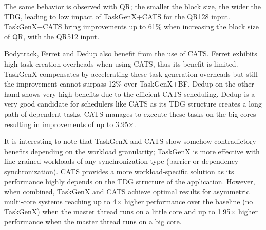 The same behavior is observed with QR; the smaller the block size, the wider the TDG, leading to low impact of TaskGenX+CATS for the QR128 input.
TaskGenX+CATS bring improvements up to 61\% when increasing the block size of QR, with the QR512 input.

Bodytrack, Ferret and Dedup also benefit from the use of CATS.
Ferret exhibits high task creation overheads when using CATS, thus its benefit is limited.
TaskGenX compensates by accelerating these task generation overheads but still the improvement cannot surpass 12\% over TaskGenX+BF.
Dedup on the other hand shows very high benefits due to the efficient CATS scheduling.
Dedup is a very good candidate for schedulers like CATS as its TDG structure creates a long path of dependent tasks.
CATS manages to execute these tasks on the big cores resulting in improvements of up to 3.95$\times$.

It is interesting to note that TaskGenX and CATS show somehow contradictory benefits depending on the workload granularity;
TaskGenX is more effective with fine-grained workloads of any synchronization type (barrier or dependency synchronization). 
CATS provides a more workload-specific solution as its performance highly depends on the TDG structure of the application.
However, when combined, TaskGenX and CATS achieve optimal results for asymmetric multi-core systems reaching up to 4$\times$ higher performance over the baseline (no TaskGenX) when the master thread runs on a little core and up to 1.95$\times$ higher performance when the master thread runs on a big core.
